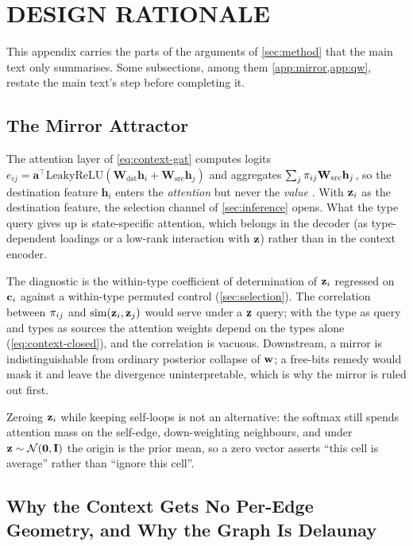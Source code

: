 \section{DESIGN RATIONALE}
\label{app:rationale}

This appendix carries the parts of the arguments of \cref{sec:method} that the main text only summarises. Some subsections, among them \cref{app:mirror,app:qw}, restate the main text's step before completing it.

\subsection{The Mirror Attractor}
\label{app:mirror}

The attention layer of \cref{eq:context-gat} computes logits $e_{ij} = \mathbf{a}^\top \mathrm{LeakyReLU}(\mathbf{W}_{\mathrm{dst}} \mathbf{h}_i + \mathbf{W}_{\mathrm{src}} \mathbf{h}_j)$ and aggregates $\sum_j \pi_{ij} \mathbf{W}_{\mathrm{src}}\mathbf{h}_j$, so the destination feature $\mathbf{h}_i$ enters the \emph{attention} but never the \emph{value} \citep{brody2022}. With $\mathbf{z}_i$ as the destination feature, the selection channel of \cref{sec:inference} opens. What the type query gives up is state-specific attention, which belongs in the decoder (as type-dependent loadings or a low-rank interaction with $\mathbf{z}$) rather than in the context encoder.

 The diagnostic is the within-type coefficient of determination of $\mathbf{z}_i$ regressed on $\mathbf{c}_i$ against a within-type permuted control (\cref{sec:selection}). The correlation between $\pi_{ij}$ and $\operatorname{sim}(\mathbf{z}_i,\mathbf{z}_j)$ would serve under a $\mathbf{z}$ query; with the type as query and types as sources the attention weights depend on the types alone (\cref{eq:context-closed}), and the correlation is vacuous. Downstream, a mirror is indistinguishable from ordinary posterior collapse of $\mathbf{w}$; a free-bits remedy \citep{kingma2016} would mask it and leave the divergence uninterpretable, which is why the mirror is ruled out first.

Zeroing $\mathbf{z}_i$ while keeping self-loops is not an alternative: the softmax still spends attention mass on the self-edge, down-weighting neighbours, and under $\mathbf{z} \sim \mathcal{N}(\mathbf{0},\mathbf{I})$ the origin is the prior mean, so a zero vector asserts ``this cell is average'' rather than ``ignore this cell''.

\subsection{Why the Context Gets No Per-Edge Geometry, and Why the Graph Is Delaunay}
\label{app:graph}

